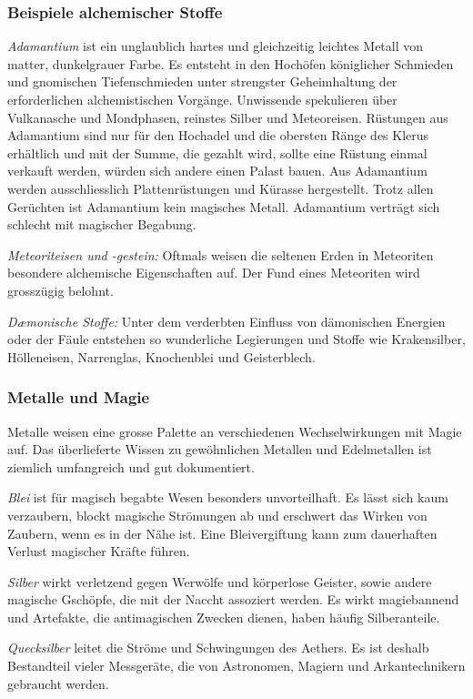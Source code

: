 \documentclass[12pt,twoside,twocolumn,openany]{book}
\begin{document}
\subsubsection{Beispiele alchemischer Stoffe}
\emph{Adamantium} ist ein unglaublich hartes und gleichzeitig leichtes Metall von matter, dunkelgrauer Farbe. Es entsteht in den Hochöfen königlicher Schmieden und gnomischen Tiefenschmieden unter strengster Geheimhaltung der erforderlichen alchemistischen Vorgänge.
Unwissende spekulieren über Vulkanasche und Mondphasen, reinstes Silber und Meteoreisen. Rüstungen aus Adamantium sind nur für den Hochadel und die obersten Ränge des Klerus erhältlich und mit der Summe, die gezahlt wird, sollte eine Rüstung einmal verkauft werden, würden sich andere einen Palast bauen. Aus Adamantium werden ausschliesslich Plattenrüstungen und Kürasse hergestellt.
Trotz allen Gerüchten ist Adamantium kein magisches Metall. Adamantium verträgt sich schlecht mit magischer Begabung.

\emph{Meteoriteisen und -gestein:} Oftmals weisen die seltenen Erden in Meteoriten besondere alchemische Eigenschaften auf. Der Fund eines Meteoriten wird grosszügig belohnt.

\emph{D\ae monische Stoffe:} Unter dem verderbten Einfluss von dämonischen Energien oder der Fäule entstehen so wunderliche Legierungen und Stoffe wie Krakensilber, Hölleneisen, Narrenglas, Knochenblei und Geisterblech.

\subsubsection{Metalle und Magie}
Metalle weisen eine grosse Palette an verschiedenen Wechselwirkungen mit Magie auf. Das überlieferte Wissen zu gewöhnlichen Metallen und Edelmetallen ist ziemlich umfangreich und gut dokumentiert.

\emph{Blei} ist für magisch begabte Wesen besonders unvorteilhaft. Es lässt sich kaum verzaubern, blockt magische Strömungen ab und erschwert das Wirken von Zaubern, wenn es in der Nähe ist. Eine Bleivergiftung kann zum dauerhaften Verlust magischer Kräfte führen. 

\emph{Silber} wirkt verletzend gegen Werwölfe und körperlose Geister, sowie andere magische Gschöpfe, die mit der Naccht assoziert werden. Es wirkt magiebannend und Artefakte, die antimagischen Zwecken dienen, haben häufig Silberanteile.

\emph{Quecksilber} leitet die Ströme und Schwingungen des Aethers. Es ist deshalb Bestandteil vieler Messgeräte, die von Astronomen, Magiern und Arkantechnikern gebraucht werden.
\end{document}

